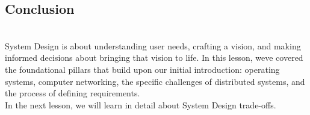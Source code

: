 \subsection{Conclusion}\label{hgHWeKpDUtIabBucygPdl}
\\
System Design is about understanding user needs, crafting a vision, and making informed decisions about bringing that vision to life. In this lesson, we\textquotesingle ve covered the foundational pillars that build upon our initial introduction: operating systems, computer networking, the specific challenges of distributed systems, and the process of defining requirements.
\\
In the next lesson, we will learn in detail about System Design trade-offs.

